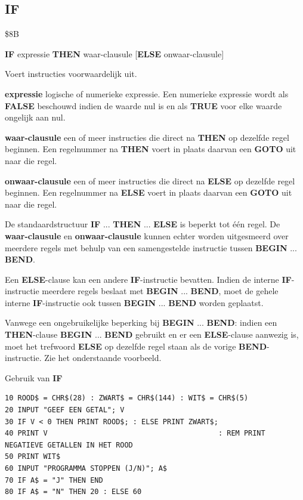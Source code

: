 \subsection{IF}
\begin{description}[leftmargin=2cm,style=nextline]
\item [Token:]    \$8B

\item [Formaat:]   {\bf IF} expressie {\bf THEN} waar-clausule [{\bf ELSE} onwaar-clausule]

\item [Gebruik:]   Voert instructies voorwaardelijk uit.

{\bf expressie} logische of numerieke expressie. Een numerieke expressie wordt als {\bf FALSE} beschouwd indien de waarde nul is en als {\bf TRUE} voor elke waarde ongelijk aan nul.

                  {\bf waar-clausule} een of meer instructies die direct na {\bf THEN} op dezelfde regel beginnen. Een regelnummer na {\bf THEN} voert in plaats daarvan een {\bf GOTO} uit naar die regel.

                  {\bf onwaar-clausule} een of meer instructies die direct na {\bf ELSE} op dezelfde regel beginnen. Een regelnummer na {\bf ELSE} voert in plaats daarvan een {\bf GOTO} uit naar die regel.

\item [Opmerkingen:]  De standaardstructuur {\bf IF} ... {\bf THEN} ... {\bf ELSE} is beperkt tot één regel. De {\bf waar-clausule} en {\bf onwaar-clausule} kunnen echter worden uitgesmeerd over meerdere regels met behulp van een samengestelde instructie tussen {\bf BEGIN} ... {\bf BEND}.

                  Een {\bf ELSE}-clause kan een andere {\bf IF}-instructie bevatten. Indien de interne {\bf IF}-instructie meerdere regels beslaat met {\bf BEGIN} ... {\bf BEND}, moet de gehele interne {\bf IF}-instructie ook tussen {\bf BEGIN} ... {\bf BEND} worden geplaatst.

                  Vanwege een ongebruikelijke beperking bij {\bf BEGIN} ... {\bf BEND}: indien een {\bf THEN}-clause {\bf BEGIN} ... {\bf BEND} gebruikt en er een {\bf ELSE}-clause aanwezig is, moet het trefwoord {\bf ELSE} op dezelfde regel staan als de vorige {\bf BEND}-instructie. Zie het onderstaande voorbeeld.

\item [Voorbeeld:]  Gebruik van {\bf IF}

\begin{tcolorbox}[colback=black,coltext=white]
\verbatimfont{\codefont}
\begin{verbatim}
10 ROOD$ = CHR$(28) : ZWART$ = CHR$(144) : WIT$ = CHR$(5)
20 INPUT "GEEF EEN GETAL"; V
30 IF V < 0 THEN PRINT ROOD$; : ELSE PRINT ZWART$;
40 PRINT V                                        : REM PRINT NEGATIEVE GETALLEN IN HET ROOD
50 PRINT WIT$
60 INPUT "PROGRAMMA STOPPEN (J/N)"; A$
70 IF A$ = "J" THEN END
80 IF A$ = "N" THEN 20 : ELSE 60


\end{verbatim}
\end{tcolorbox}
\end{description}
